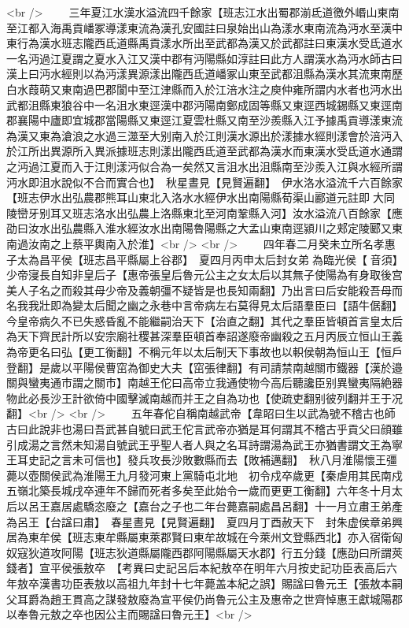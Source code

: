 <br />
　　三年夏江水漢水溢流四千餘家【班志江水出蜀郡湔氐道徼外㟭山東南至江都入海禹貢嶓冢導漾東流為漢孔安國註曰泉始出山為漾水東南流為沔水至漢中東行為漢水班志隴西氐道縣禹貢漾水所出至武都為漢又於武都註曰東漢水受氐道水一名沔過江夏謂之夏水入江又漢中郡有沔陽縣如淳註曰此方人謂漢水為沔水師古曰漢上曰沔水經則以為沔漾異源漾出隴西氐道嶓冢山東至武都沮縣為漢水其流東南歷白水葭萌又東南過巴郡閬中至江津縣而入於江涪水注之庾仲雍所謂内水者也沔水出武都沮縣東狼谷中一名沮水東逕漢中郡沔陽南鄭成固等縣又東逕西城錫縣又東逕南郡襄陽中廬即宜城郡當陽縣又東逕江夏雲杜縣又南至沙羨縣入江予據禹貢導漾東流為漢又東為滄浪之水過三澨至大别南入於江則漢水源出於漾據水經則漾會於涪沔入於江所出異源所入異派據班志則漾出隴西氐道至武都為漢水而東漢水受氐道水通謂之沔過江夏而入于江則漾沔似合為一矣然又言沮水出沮縣南至沙羨入江與水經所謂沔水即沮水說似不合而實合也】　秋星晝見【見賢遍翻】　伊水洛水溢流千六百餘家【班志伊水出弘農郡熊耳山東北入洛水水經伊水出南陽縣荀渠山酈道元註即大同陵巒牙别耳又班志洛水出弘農上洛縣東北至河南鞏縣入河】汝水溢流八百餘家【應劭曰汝水出弘農縣入淮水經汝水出南陽魯陽縣之大孟山東南逕潁川之郏定陵郾又東南過汝南之上蔡平輿南入於淮】<br />
<br />
　　四年春二月癸未立所名孝惠子太為昌平侯【班志昌平縣屬上谷郡】　夏四月丙申太后封女弟為臨光侯【音須】少帝寖長自知非皇后子【惠帝張皇后魯元公主之女太后以其無子使陽為有身取後宫美人子名之而殺其母少帝及義朝彊不疑皆是也長知兩翻】乃出言曰后安能殺吾母而名我我壯即為變太后聞之幽之永巷中言帝病左右莫得見太后語羣臣曰【語牛倨翻】今皇帝病久不已失惑昏亂不能繼嗣治天下【治直之翻】其代之羣臣皆頓首言皇太后為天下齊民計所以安宗廟社稷甚深羣臣頓首奉詔遂廢帝幽殺之五月丙辰立恒山王義為帝更名曰弘【更工衡翻】不稱元年以太后制天下事故也以軹侯朝為恒山王【恒戶登翻】是歲以平陽侯曹窋為御史大夫【窋張律翻】有司請禁南越關市鐵器【漢於邉關與蠻夷通市謂之關市】南越王佗曰高帝立我通使物今高后聽讒臣别異蠻夷隔絶器物此必長沙王計欲倚中國擊滅南越而并王之自為功也【使疏吏翻别彼列翻并王于况翻】<br />
<br />
　　五年春佗自稱南越武帝【韋眧曰生以武為號不稽古也師古曰此說非也湯曰吾武甚自號曰武王佗言武帝亦猶是耳何謂其不稽古乎貢父曰顔雖引成湯之言然未知湯自號武王乎聖人者人與之名耳詩謂湯為武王亦猶書謂文王為寧王耳史記之言未可信也】發兵攻長沙敗數縣而去【敗補邁翻】　秋八月淮陽懷王彊薨以壺關侯武為淮陽王九月發河東上黨騎屯北地　初令戍卒歲更【秦虐用其民南戍五嶺北築長城戌卒連年不歸而死者多矣至此始令一歲而更更工衡翻】六年冬十月太后以呂王嘉居處驕恣廢之【嘉台之子也二年台薨嘉嗣處昌呂翻】十一月立肅王弟產為呂王【台諡曰肅】　春星晝見【見賢遍翻】　夏四月丁酉赦天下　封朱虚侯章弟興居為東牟侯【班志東牟縣屬東萊郡賢曰東牟故城在今萊州文登縣西北】亦入宿衛匈奴寇狄道攻阿陽【班志狄道縣屬隴西郡阿陽縣屬天水郡】行五分錢【應劭曰所謂莢錢者】宣平侯張敖卒　【考異曰史記呂后本紀敖卒在明年六月按史記功臣表高后六年敖卒漢書功臣表敖以高祖九年封十七年薨盖本紀之誤】賜諡曰魯元王【張敖本嗣父耳爵為趙王貫高之謀發敖廢為宣平侯仍尚魯元公主及惠帝之世齊悼惠王獻城陽郡以奉魯元敖之卒也因公主而賜諡曰魯元王】<br />

